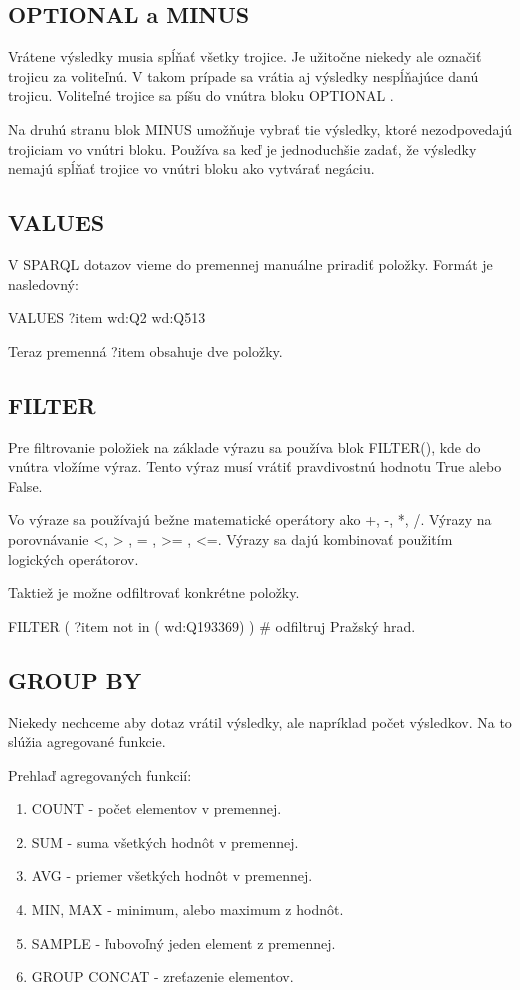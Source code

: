 \subsection*{OPTIONAL a MINUS}

Vrátene výsledky musia spĺňať všetky trojice.
Je užitočne niekedy ale označiť trojicu za voliteľnú. V takom prípade sa vrátia aj výsledky nespĺňajúce
danú trojicu. Voliteľné trojice sa píšu do vnútra bloku OPTIONAL {}.

Na druhú stranu blok MINUS {} umožňuje vybrať tie výsledky, ktoré nezodpovedajú trojiciam vo vnútri bloku.
Používa sa keď je jednoduchšie zadať, že výsledky nemajú spĺňať trojice vo vnútri bloku ako vytvárať negáciu.

\subsection*{VALUES}
V SPARQL dotazov vieme do premennej manuálne priradiť položky. Formát je nasledovný:
\begin{code}
    VALUES ?item { wd:Q2 wd:Q513 }
\end{code}
Teraz premenná ?item obsahuje dve položky.

\subsection*{FILTER}
Pre filtrovanie položiek na základe výrazu sa používa blok FILTER(), kde do vnútra vložíme výraz.
Tento výraz musí vrátiť pravdivostnú hodnotu True alebo False.

Vo výraze sa používajú bežne matematické operátory ako +, -, *, /. Výrazy na porovnávanie
<, > , = , >= , <=. Výrazy sa dajú kombinovať použitím logických operátorov.

Taktiež je možne odfiltrovať konkrétne položky.
\begin{code}
    FILTER ( ?item not in ( wd:Q193369) ) # odfiltruj Pražský hrad.
\end{code}

\subsection*{GROUP BY}
Niekedy nechceme aby dotaz vrátil výsledky, ale napríklad počet výsledkov.
Na to slúžia agregované funkcie.

Prehlaď agregovaných funkcií:
\begin{enumerate}
    \item COUNT - počet elementov v premennej.
    \item SUM - suma všetkých hodnôt v premennej.
    \item AVG - priemer všetkých hodnôt v premennej.
    \item MIN, MAX - minimum, alebo maximum z hodnôt.
    \item SAMPLE - ľubovoľný jeden element z premennej.
    \item GROUP CONCAT - zreťazenie elementov.
\end{enumerate}

